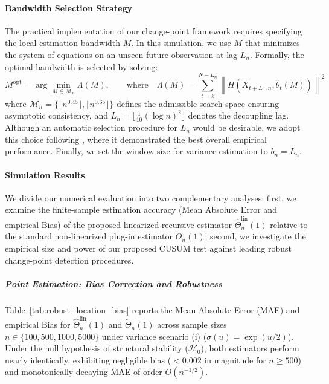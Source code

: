 \documentclass[10pt, a4paper]{article}
\theoremstyle{assumption}
\theoremstyle{definition}
\theoremstyle{theorem}
\begin{document}
\paragraph{Bandwidth Selection Strategy}
The practical implementation of our change-point framework requires specifying the local estimation bandwidth $M$. In this simulation, we use $M$ that minimizes the system of equations on an unseen future observation at lag $L_n$. Formally, the optimal bandwidth is selected by solving:
\begin{equation}
    M^{\text{opt}} = \arg\min_{M \in \mathcal{M}_n} \Lambda(M), \qquad \text{where} \quad \Lambda(M) = \sum_{t=k}^{N - L_n} \left\| H\left(X_{t+L_n,n}, \widehat{\theta}_{t}(M)\right) \right\|^2
\end{equation}
where $\mathcal{M}_n = \{ \lfloor n^{0.45}\rfloor, \lfloor n^{0.65} \rfloor \}$ defines the admissible search space ensuring asymptotic consistency, and $L_n = \lfloor \frac{1}{10} (\log n)^2 \rfloor$ denotes the decoupling lag. Although an automatic selection procedure for $L_n$ would be desirable, we adopt this choice following \cite{Mies2023}, where it demonstrated the best overall empirical performance. Finally, we set the window size for variance estimation to $b_n = L_n$.


\paragraph{Simulation Results}
We divide our numerical evaluation into two complementary analyses: first, we examine the finite-sample estimation accuracy (Mean Absolute Error and empirical Bias) of the proposed linearized recursive estimator $\widehat{\Theta}_n^{\text{lin}}(1)$ relative to the standard non-linearized plug-in estimator $\widetilde{\Theta}_n(1)$; second, we investigate the empirical size and power of our proposed CUSUM test against leading robust change-point detection procedures.

\subparagraph{Point Estimation: Bias Correction and Robustness}
Table~\ref{tab:robust_location_bias} reports the Mean Absolute Error (MAE) and empirical Bias for $\widehat{\Theta}_n^{\text{lin}}(1)$ and $\widetilde{\Theta}_n(1)$ across sample sizes $n \in \{100, 500, 1000, 5000\}$ under variance scenario (i) ($\sigma(u) = \exp(u/2)$).
Under the null hypothesis of structural stability ($\mathcal{H}_0$), both estimators perform nearly identically, exhibiting negligible bias ($< 0.002$ in magnitude for $n \ge 500$) and monotonically decaying MAE of order $O(n^{-1/2})$.
\end{document}

